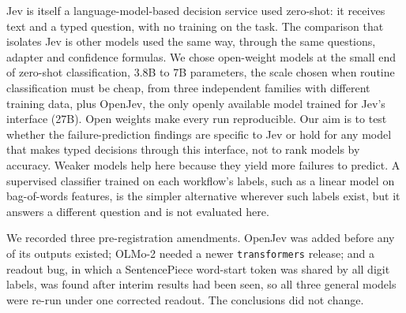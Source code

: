  Jev is itself a language-model-based decision
service used zero-shot: it receives text and a typed question, with no
training on the task. The comparison that isolates Jev is
other models used the same way, through the same questions, adapter and
confidence formulas. We chose open-weight models at the small end of
zero-shot classification, 3.8B to 7B parameters, the scale chosen when
routine classification must be cheap, from three independent families
with different training data, plus OpenJev, the only openly available
model trained for Jev's interface (27B). Open weights make every run
reproducible. Our aim is to test whether the failure-prediction findings
are specific to Jev or hold for any model that makes typed decisions
through this interface, not to rank models by accuracy. Weaker models
help here because they yield more failures to predict. A
supervised classifier trained on each workflow's labels, such as a
linear model on bag-of-words features, is the simpler alternative
wherever such labels exist, but it answers a different question and is not
evaluated here.

 We recorded three pre-registration
amendments. OpenJev was added before any of its outputs existed; OLMo-2
needed a newer \texttt{transformers} release; and a readout bug, in
which a SentencePiece word-start token was shared by all digit labels,
was found after interim results had been seen, so all three general
models were re-run under one corrected readout. The conclusions did not
change.

\begin{colfigure}
\centering
{}
\caption{Across five models, the decision-feature estimator ranks wrong
workflow actions better than the model's own final-step confidence. The
intervals overlap only for OLMo-2.}
\label{fig:crossmodel}
\end{colfigure}

